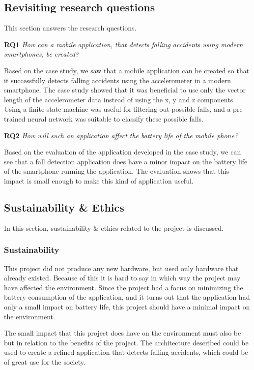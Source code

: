 \documentclass[12pt, a4paper, onecolumn]{article}
\begin{document}
	\subsection{Revisiting research questions}
	
	This section answers the research questions.
	
	\textbf{RQ1} \textit{How can a mobile application, that detects falling accidents using modern smartphones, be created?}
	
	Based on the case study, we saw that a mobile application can be created so that it successfully detects falling accidents using the accelerometer in a modern smartphone. The case study showed that it was beneficial to use only the vector length of the accelerometer data instead of using the x, y and z components. Using a finite state machine was useful for filtering out possible falls, and a pre-trained neural network was suitable to classify these possible falls.
	
	\textbf{RQ2} \textit{How will such an application affect the battery life of the mobile phone?}
	
	Based on the evaluation of the application developed in the case study, we can see that a fall detection application does have a minor impact on the battery life of the smartphone running the application. The evaluation shows that this impact is small enough to make this kind of application useful.
	
	\subsection{Sustainability \& Ethics}
	
	In this section, sustainability \& ethics related to the project is discussed.
	
	\subsubsection{Sustainability}
	
	This project did not produce any new hardware, but used only hardware that already existed. Because of this it is hard to say in which way the project may have affected the environment. Since the project had a focus on minimizing the battery consumption of the application, and it turns out that the application had only a small impact on battery life, this project should have a minimal impact on the environment.
	
	The small impact that this project does have on the environment must also be but in relation to the benefits of the project. The architecture described could be used to create a refined application that detects falling accidents, which could be of great use for the society.
	
\end{document}
